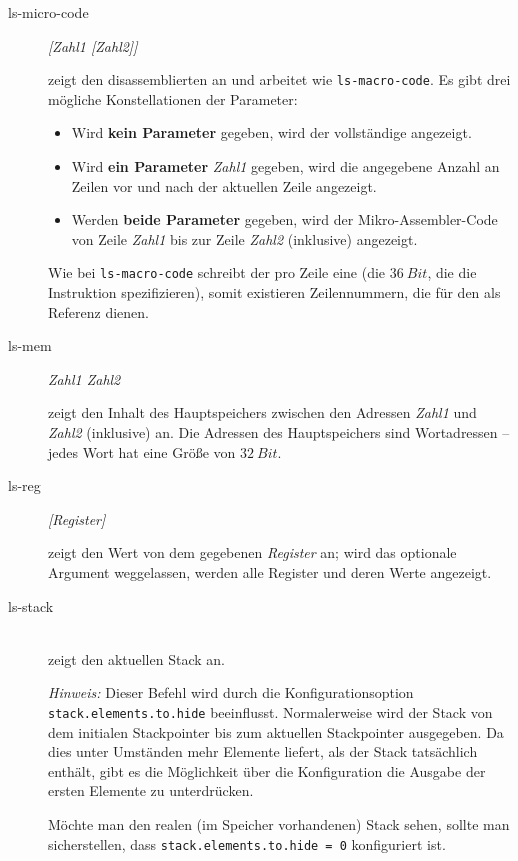 \begin{description}
\item[ls-micro-code] \emph{[Zahl1 [Zahl2]]}

  zeigt den disassemblierten \mac an und arbeitet wie \texttt{ls-macro-code}. Es gibt drei mögliche Konstellationen der Parameter:
  \begin{itemize}
  \item Wird \textbf{kein Parameter} gegeben, wird der vollständige \mac angezeigt.
  \item Wird \textbf{ein Parameter} \emph{Zahl1} gegeben, wird die angegebene Anzahl an Zeilen vor und nach der aktuellen Zeile angezeigt.
  \item Werden \textbf{beide Parameter} gegeben, wird der Mikro-Assembler-Code von Zeile \emph{Zahl1} bis zur Zeile \emph{Zahl2} (inklusive) angezeigt.
  \end{itemize}

  Wie bei \texttt{ls-macro-code} schreibt der \md pro Zeile eine \mai (die $36~Bit$, die die Instruktion spezifizieren), somit existieren Zeilennummern, die für den \md als Referenz dienen.

\item[ls-mem] \emph{Zahl1 Zahl2}

  zeigt den Inhalt des Hauptspeichers zwischen den Adressen \emph{Zahl1} und \emph{Zahl2} (inklusive) an. Die Adressen des Hauptspeichers sind Wortadressen -- jedes Wort hat eine Größe von $32~Bit$.

\item[ls-reg] \emph{[Register]}

  zeigt den Wert von dem gegebenen \emph{Register} an; wird das optionale Argument weggelassen, werden alle Register und deren Werte angezeigt.

\item[ls-stack] \hspace*{\fill}\\

  zeigt den aktuellen Stack an.

  \emph{Hinweis:} Dieser Befehl wird durch die Konfigurationsoption \texttt{stack.elements.to.hide} beeinflusst. Normalerweise wird der Stack von dem initialen Stackpointer bis zum aktuellen Stackpointer ausgegeben. Da dies unter Umständen mehr Elemente liefert, als der Stack tatsächlich enthält, gibt es die Möglichkeit über die Konfiguration die Ausgabe der ersten Elemente zu unterdrücken.

Möchte man den realen (im Speicher vorhandenen) Stack sehen, sollte man sicherstellen, dass \texttt{stack.elements.to.hide = 0} konfiguriert ist.


\end{description}
